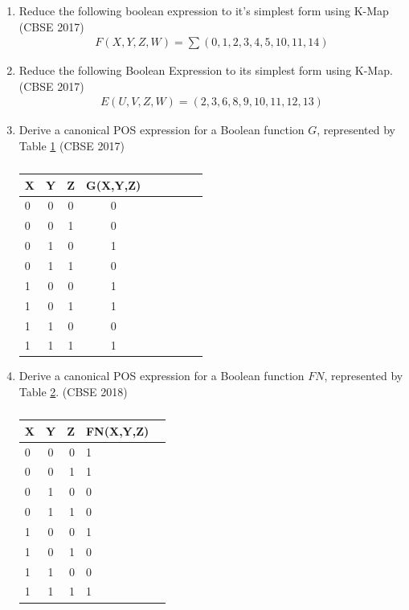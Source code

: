 \begin{enumerate}
	\item Reduce the following boolean expression to it's simplest form using K-Map
\hfill (CBSE 2017)
\label{prob:2017-1/c/6/d}
		\begin{align}
F(X,Y,Z,W) = \sum(0,1,2,3,4,5,10,11,14)
\label{eq:2017-1/c/6/d}
		\end{align}
	\item
		Reduce the following Boolean Expression to its simplest form using K-Map.
\hfill (CBSE 2017)
\label{prob:2017/c/6/d}
		\begin{align}
E(U,V,Z,W)=   (2 , 3 , 6 , 8 , 9 , 10 , 11 , 12 , 13 )
\label{eq:2017/c/6/d}
		\end{align}
	\item Derive a canonical POS expression for a Boolean function $G$, represented by Table 
\ref{tab:2017/c/6/c}
\label{prob:2017/c/6/c}
\hfill (CBSE 2017)
		\begin{table}[htbp]
 \begin{center}
    \begin{tabular}{|l|c|c|c|c|c|c|c|c|} \hline 
  \textbf{X}& \textbf{Y} & \textbf{Z} &\textbf{G(X,Y,Z)} \\
 \hline
 0&0&0&0\\ \hline
0&0&1&0 \\ \hline
0&1&0&1\\ \hline
0&1&1&0  \\ \hline
1&0&0&1\\ \hline
1&0&1&1\\ \hline
1&1&0&0\\ \hline
1&1&1&1\\ \hline
\end{tabular}   
\end{center}
\caption{}
\label{tab:2017/c/6/c}
\end{table}
\item Derive a canonical POS expression for a Boolean function $FN$, represented by Table 
\ref{tab:2018/c/6/c}.
\label{prob:2018/c/6/c}
\hfill (CBSE 2018)
		\begin{table}[!ht]
			\centering
\begin{tabular}{|l|c|r|l|c|}
    \hline %
      \textbf{X} & \textbf{Y} & \textbf{Z} & \textbf{FN(X,Y,Z)}\\
      \hline
      0 & 0 & 0 & 1\\
\hline
      0 & 0 & 1 & 1\\
\hline
      0 & 1 & 0 & 0\\
\hline
      0 & 1 & 1 & 0\\
\hline
      1 & 0 & 0 & 1\\
\hline
      1 & 0 & 1 & 0\\
\hline
      1 & 1 & 0 & 0\\
\hline
      1 & 1 & 1 & 1\\
      \hline      
   \end{tabular}
\caption{}
\label{tab:2018/c/6/c}
   \end{table}


\end{enumerate}
